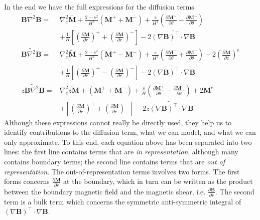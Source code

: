 In the end we have the full expressions for the diffusion terms
\begin{equation}
\begin{aligned}
    \overline{\mathbf{B}\nabla^2 \mathbf{B}} =& \nabla_e^2 \overline{\mathbf{M}} + \frac{2 - s^2}{H^3} \left(\mathbf{M}^+ + \mathbf{M}^-\right) + \frac{s}{H^2} \left(\frac{\partial \mathbf{M}^+}{\partial \theta} - \frac{\partial \mathbf{M}^-}{\partial \theta}\right) \\
    &+ \frac{1}{H} \left[\left(\frac{\partial \mathbf{M}}{\partial r}\right)^+ + \left(\frac{\partial \mathbf{M}}{\partial r}\right)^-\right] - 2\overline{(\nabla\mathbf{B})^\intercal\cdot \nabla\mathbf{B}} \\
    \widetilde{\mathbf{B}\nabla^2 \mathbf{B}} =& \nabla_e^2 \widetilde{\mathbf{M}} + \frac{2 - s^2}{H^3} \left(\mathbf{M}^+ - \mathbf{M}^-\right) + \frac{s}{H^2} \left(\frac{\partial \mathbf{M}^+}{\partial \theta} + \frac{\partial \mathbf{M}^-}{\partial \theta}\right) - 2 \left(\frac{\partial \mathbf{M}}{\partial z}\right)^e \\
    &+ \frac{1}{H} \left[\left(\frac{\partial \mathbf{M}}{\partial r}\right)^+ - \left(\frac{\partial \mathbf{M}}{\partial r}\right)^-\right] - 2\widetilde{(\nabla\mathbf{B})^\intercal\cdot \nabla\mathbf{B}} \\ 
    \widetilde{z \mathbf{B}\nabla^2 \mathbf{B}} =& \nabla_e^2 \widetilde{z\mathbf{M}} + \left(\mathbf{M}^+ + \mathbf{M}^-\right) + \frac{s}{H} \left(\frac{\partial \mathbf{M}^+}{\partial \theta} - \frac{\partial \mathbf{M}^-}{\partial \theta}\right) + 2 \mathbf{M}^e \\
    &+ \left[\left(\frac{\partial \mathbf{M}}{\partial r}\right)^+ + \left(\frac{\partial \mathbf{M}}{\partial r}\right)^-\right] - 2\widetilde{z (\nabla\mathbf{B})^\intercal\cdot \nabla\mathbf{B}}
\end{aligned}
\end{equation}
Although these expressions cannot really be directly used, they help us to identify contributions to the diffusion term, what we can model, and what we can only approximate. To this end, each equation above has been separated into two lines: the first line contains terms that are \textit{in representation}, although many contains boundary terms; the second line contains terms that are \textit{out of representation}. The out-of-representation terms involves two forms. The first forms concerns $\frac{\partial \mathbf{M}}{\partial r}$ at the boundary, which in turn can be written as the product between the boundary magnetic field and the magnetic shear, i.e. $\frac{\partial \mathbf{B}}{\partial r}$. The second term is a bulk term which concerns the symmetric anti-symmetric integral of $(\nabla \mathbf{B})^\intercal \cdot \nabla \mathbf{B}$.



